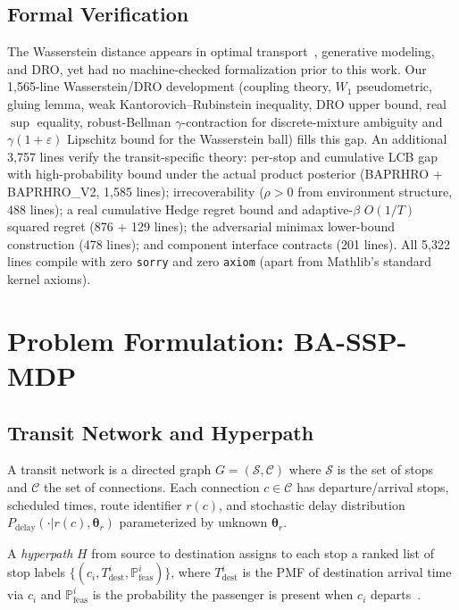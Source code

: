 \documentclass[opre,dblanonrev]{informs4}
\begin{document}
\subsection{Formal Verification}

The Wasserstein distance appears in optimal transport~\citep{villani2009},
generative modeling, and DRO, yet had no machine-checked formalization
prior to this work.
Our 1{,}565-line Wasserstein/DRO development (coupling theory,
$W_1$ pseudometric, gluing lemma, weak Kantorovich--Rubinstein
inequality, DRO upper bound, real $\sup$ equality, robust-Bellman
$\gamma$-contraction for discrete-mixture ambiguity and
$\gamma(1+\varepsilon)$ Lipschitz bound for the Wasserstein ball)
fills this gap. An additional 3{,}757 lines
verify the transit-specific theory: per-stop and cumulative LCB
gap with high-probability bound under the actual product posterior
(BAPRHRO + BAPRHRO\_V2, 1{,}585 lines); irrecoverability ($\rho > 0$
from environment structure, 488 lines); a real cumulative Hedge
regret bound and adaptive-$\beta$ $O(1/T)$ squared regret (876 + 129
lines); the adversarial minimax lower-bound construction (478
lines); and component interface contracts (201 lines).
All 5{,}322 lines compile with zero \texttt{sorry} and zero
\texttt{axiom} (apart from Mathlib's standard kernel axioms).

\section{Problem Formulation: BA-SSP-MDP}
\label{sec:model}

\subsection{Transit Network and Hyperpath}

A transit network is a directed graph $G = (\mathcal{S}, \mathcal{C})$ where $\mathcal{S}$ is the set of stops and $\mathcal{C}$ the set of connections. Each connection $c \in \mathcal{C}$ has departure/arrival stops, scheduled times, route identifier $r(c)$, and stochastic delay distribution $P_{\mathrm{delay}}(\cdot | r(c), \bm{\theta}_r)$ parameterized by unknown $\bm{\theta}_r$.

A \emph{hyperpath} $H$ from source to destination assigns to each stop a ranked list of stop labels $\{(c_i, T_{\mathrm{dest}}^i, \mathbb{P}_{\mathrm{feas}}^i)\}$, where $T_{\mathrm{dest}}^i$ is the PMF of destination arrival time via $c_i$ and $\mathbb{P}_{\mathrm{feas}}^i$ is the probability the passenger is present when $c_i$ departs~\citep{durner2024}.
\end{document}

